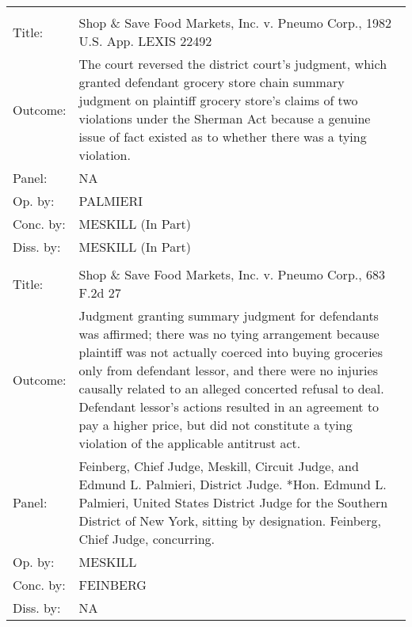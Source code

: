 \documentclass[10pt, letterpaper]{article}
\begin{document}
\begin{spacing}{1.0}
\begin{footnotesize}
\begin{longtable}[H]{lp{6in}}
        \arrayrulecolor{black}\hline\\[-4pt]
        Title: & Shop \& Save Food Markets, Inc. v. Pneumo Corp., 1982 U.S. App. LEXIS 22492\\[2pt]
        Outcome: & The court reversed the district court's judgment, which granted defendant grocery store chain summary judgment on plaintiff grocery store's claims of two violations under the Sherman Act because a genuine issue of fact existed as to whether there was a tying violation.\\[2pt]
        Panel: & NA\\[2pt]
        Op. by: & PALMIERI \\[2pt]
        Conc. by: & MESKILL (In Part) \\[2pt]
        Diss. by: & MESKILL (In Part) \\[2pt]
        \arrayrulecolor{gray}\hline\\[-4pt]
        Title: & Shop \& Save Food Markets, Inc. v. Pneumo Corp., 683 F.2d 27\\[2pt]
        Outcome: & Judgment granting summary judgment for defendants was affirmed; there was no tying arrangement because plaintiff was not actually coerced into buying groceries only from defendant lessor, and there were no injuries causally related to an alleged concerted refusal to deal. Defendant lessor's actions resulted in an agreement to pay a higher price, but did not constitute a tying violation of the applicable antitrust act.\\[2pt]
        Panel: & Feinberg, Chief Judge, Meskill, Circuit Judge, and Edmund L. Palmieri, District Judge. *Hon. Edmund L. Palmieri, United States District Judge for the Southern District of New York, sitting by designation. Feinberg, Chief Judge, concurring.  \\[2pt]
        Op. by: & MESKILL \\[2pt]
        Conc. by: & FEINBERG \\[2pt]
        Diss. by: & NA\\[2pt]
        

\end{longtable}
\end{footnotesize}
\end{spacing}
\end{document}
